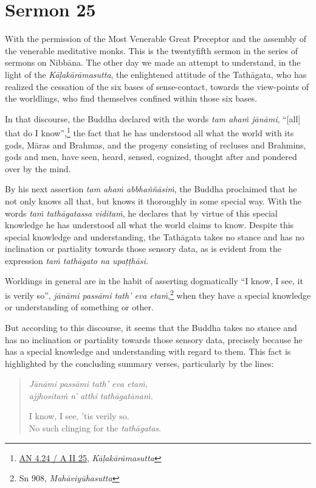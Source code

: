 \chapter{Sermon 25}

\NibbanaOpeningQuote

With the permission of the Most Venerable Great Preceptor and the assembly of the venerable meditative monks. This is the twentyfifth sermon in the series of sermons on Nibbāna. The other day we made an attempt to understand, in the light of the \emph{Kāḷakārāmasutta}, the enlightened attitude of the Tathāgata, who has realized the cessation of the six bases of sense-contact, towards the view-points of the worldlings, who find themselves confined within those six bases.

In that discourse, the Buddha declared with the words \emph{tam ahaṁ jānāmi}, ``[all] that do I know'',\footnote{\href{https://suttacentral.net/an4.24/pli/ms}{AN 4.24 / A II 25}, \emph{Kāḷakārāmasutta}} the fact that he has understood all what the world with its gods, Māras and Brahmas, and the progeny consisting of recluses and Brahmins, gods and men, have seen, heard, sensed, cognized, thought after and pondered over by the mind.

By his next assertion \emph{tam ahaṁ abbhaññāsiṁ}, the Buddha proclaimed that he not only knows all that, but knows it thoroughly in some special way. With the words \emph{taṁ tathāgatassa viditaṁ}, he declares that by virtue of this special knowledge he has understood all what the world claims to know. Despite this special knowledge and understanding, the Tathāgata takes no stance and has no inclination or partiality towards those sensory data, as is evident from the expression \emph{taṁ tathāgato na upaṭṭhāsi.}

Worldings in general are in the habit of asserting dogmatically ``I know, I see, it is verily so'', \emph{jānāmi passāmi tath' eva etaṁ},\footnote{Sn 908, \emph{Mahāviyūhasutta}} when they have a special knowledge or understanding of something or other.

But according to this discourse, it seems that the Buddha takes no stance and has no inclination or partiality towards those sensory data, precisely because he has a special knowledge and understanding with regard to them. This fact is highlighted by the concluding summary verses, particularly by the lines:

\begin{quote}
\emph{Jānāmi passāmi tath' eva etaṁ,}\\
\emph{ajjhositaṁ n' atthi tathāgatānaṁ.}

I know, I see, 'tis verily so.\\
No such clinging for the \emph{tathāgatas}.
\end{quote}


